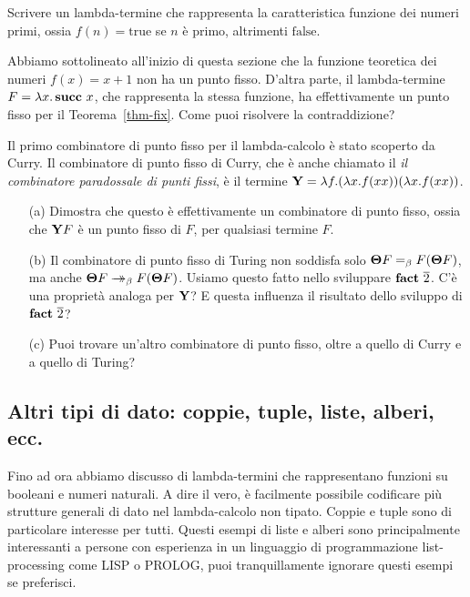 \documentclass{article}
\begin{document}
\begin{exercise}
  Scrivere un lambda-termine che rappresenta la caratteristica
  funzione dei numeri primi, ossia $f(n)=\mbox{true}$ se $n$ \`e
  primo, altrimenti $\mbox{false}$. 
\end{exercise}

\begin{exercise}
  Abbiamo sottolineato all'inizio di questa sezione che
  la funzione teoretica dei numeri $f(x)=x+1$ non ha un
  punto fisso. D'altra parte, il lambda-termine $F=\lambda x.\mathop{\textbf{\bf succ}\,} x$,
  che rappresenta la stessa funzione, ha effettivamente un punto fisso per
  il Teorema~\ref{thm-fix}. Come puoi risolvere la contraddizione?
\end{exercise}

\begin{exercise}
  Il primo combinatore di punto fisso per il lambda-calcolo \`e stato
  scoperto da Curry. Il combinatore di punto fisso di Curry, che \`e anche chiamato il
  {\em il combinatore paradossale di punti fissi}, \`e il termine ${\bf Y}=\lambda f.(\lambda
  x.f(xx))(\lambda x.f(xx))$.
  \begin{enumerate}
  \item[(a)] Dimostra che questo \`e effettivamente un combinatore di punto fisso,
  ossia che ${\bf Y} F$ \`e un punto fisso di $F$, per qualsiasi termine $F$.
  \item[(b)] Il combinatore di punto fisso di Turing non soddisfa solo $\textbf{\boldmath $\Theta$}
    F=_{\beta} F(\textbf{\boldmath $\Theta$} F)$, ma anche $\textbf{\boldmath $\Theta$} F\mathrel{\rightarrow\!\!\!\!\!\rightarrow}_{\beta} F(\textbf{\boldmath $\Theta$} F)$. Usiamo
    questo fatto nello sviluppare $\mathop{\textbf{\bf fact}\,}\mathop{\overline{2}}$. C'\`e una propriet\`a analoga per ${\bf Y}$? 
    E questa influenza il risultato dello sviluppo di $\mathop{\textbf{\bf fact}\,}\mathop{\overline{2}}$?
  \item[(c)] Puoi trovare un'altro combinatore di punto fisso, oltre
  a quello di Curry e a quello di Turing?
  \end{enumerate}
\end{exercise}

\subsection{Altri tipi di dato: coppie, tuple, liste, alberi, ecc.}

Fino ad ora abbiamo discusso di lambda-termini che rappresentano funzioni
su booleani e numeri naturali. A dire il vero, \`e facilmente possibile codificare
pi\`u strutture generali di dato nel lambda-calcolo non tipato. Coppie e tuple
sono di particolare interesse per tutti. Questi esempi di liste e alberi sono
principalmente interessanti a persone con esperienza in
un linguaggio di programmazione list-processing come LISP o PROLOG, puoi
tranquillamente ignorare questi esempi se preferisci.
\end{document}
